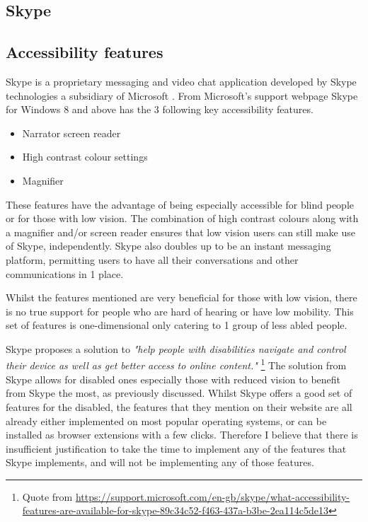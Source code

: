 \subsection{Skype}

\subsection*{Accessibility features}

Skype is a proprietary messaging and video chat application
developed by Skype technologies a subsidiary of Microsoft 
\cite{skype}. From Microsoft's support webpage Skype for 
Windows 8 and above has the 3 following key accessibility 
features.

\begin{itemize}
  \item Narrator screen reader
  \item High contrast colour settings
  \item Magnifier
\end{itemize}

These features have the advantage of being especially 
accessible for blind people or for those with low vision. The 
combination of high contrast colours along with a magnifier 
and/or screen reader ensures that low vision users can still 
make use of Skype, independently. Skype also doubles up to be
an instant messaging platform, permitting users to have all 
their conversations and other communications in 1 place.

\vspace{0.2cm}

Whilst the features mentioned are very beneficial for those 
with low vision, there is no true support for people who are
hard of hearing or have low mobility. This set of features is 
one-dimensional only catering to 1 group of less abled people.

\vspace{0.2cm}

Skype proposes a solution to \textit{"help people with 
disabilities navigate and control their device as well as get
better access to online content."} 
\footnote{Quote from \url{https://support.microsoft.com/en-gb/skype/what-accessibility-features-are-available-for-skype-89c34c52-f463-437a-b3be-2ea114c5de13}}
The solution from Skype allows for disabled ones especially 
those with reduced vision to benefit from Skype the most, as 
previously discussed. Whilst Skype offers a good set of
features for the disabled, the features that they mention on 
their website are all already either implemented on most 
popular operating systems, or can be installed as browser 
extensions with a few clicks. Therefore I believe that there is
insufficient justification to take the time to implement any 
of the features that Skype implements, and will not be 
implementing any of those features.

